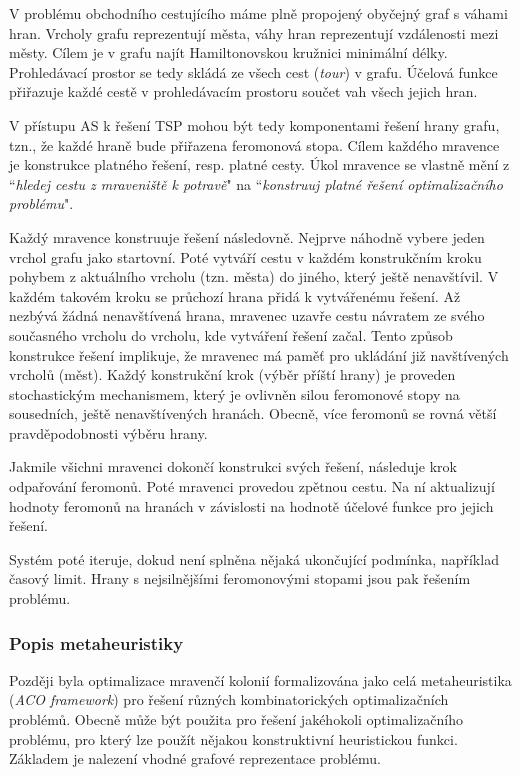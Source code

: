 \documentclass[a4paper,12pt]{article}
\begin{document}
V problému obchodního cestujícího máme plně propojený obyčejný graf s váhami hran. Vrcholy grafu reprezentují
města, váhy hran reprezentují vzdálenosti mezi městy. Cílem je v grafu najít Hamiltonovskou kružnici
minimální délky. Prohledávací prostor se tedy skládá ze všech cest ({\it tour}) v grafu.
Účelová funkce přiřazuje každé cestě v prohledávacím prostoru součet vah všech jejich hran.

\medskip

V přístupu AS k řešení TSP mohou být tedy komponentami řešení hrany grafu, tzn., že každé hraně bude přiřazena
feromonová stopa. Cílem každého mravence je konstrukce platného řešení, resp. platné cesty.
Úkol mravence se vlastně mění z \textquotedblleft{\it hledej cestu z mraveniště k potravě}" na
 \textquotedblleft{\it konstruuj platné řešení optimalizačního problému}".

Každý mravence konstruuje řešení následovně. Nejprve náhodně vybere jeden vrchol grafu jako startovní.
Poté vytváří cestu v každém konstrukčním kroku pohybem z aktuálního vrcholu (tzn. města) do jiného,
který ještě nenavštívil. V každém takovém kroku se průchozí hrana přidá k vytvářenému řešení. Až nezbývá
žádná nenavštívená hrana, mravenec uzavře cestu návratem ze svého současného vrcholu do vrcholu, kde
vytváření řešení začal. Tento způsob konstrukce řešení implikuje, že mravenec má paměť pro ukládání
již navštívených vrcholů (měst). Každý konstrukční krok (výběr příští hrany) je proveden stochastickým mechanismem,
který je ovlivněn silou feromonové stopy na sousedních, ještě nenavštívených hranách. Obecně, více feromonů se rovná větší pravděpodobnosti výběru hrany.

Jakmile všichni mravenci dokončí konstrukci svých řešení, následuje krok odpařování feromonů. Poté mravenci
provedou zpětnou cestu. Na ní aktualizují hodnoty feromonů na hranách v závislosti na hodnotě účelové funkce
pro jejich řešení.

Systém poté iteruje, dokud není splněna nějaká ukončující podmínka, například časový limit. Hrany s nejsilnějšími
feromonovými stopami jsou pak řešením problému.

\subsubsection{Popis metaheuristiky}
Později byla optimalizace mravenčí kolonií formalizována jako celá metaheuristika ({\it ACO framework})
pro řešení různých kombinatorických
optimalizačních problémů. Obecně může být použita pro řešení jakéhokoli optimalizačního problému, pro který lze
použít nějakou konstruktivní heuristickou funkci. Základem je nalezení vhodné grafové reprezentace problému.
\end{document}

